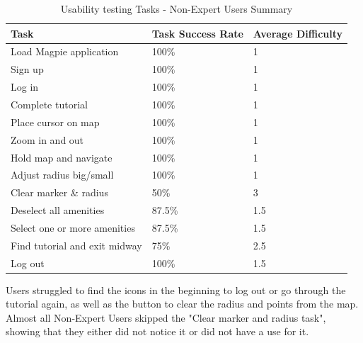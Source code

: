 \begin{table}[h!]
  \centering
  \caption{Usability testing Tasks - Non-Expert Users Summary}
  \begin{tabular}{|p{}|p{}|p{}|}
    \hline
    \textbf{Task}                 & \textbf{Task Success Rate} & \textbf{Average Difficulty} \\
    \hline
    Load Magpie application       & 100\%                      & 1                           \\
    \hline
    Sign up                       & 100\%                      & 1                           \\
    \hline
    Log in                        & 100\%                      & 1                           \\
    \hline
    Complete tutorial             & 100\%                      & 1                           \\
    \hline
    Place cursor on map           & 100\%                      & 1                           \\
    \hline
    Zoom in and out               & 100\%                      & 1                           \\
    \hline
    Hold map and navigate         & 100\%                      & 1                           \\
    \hline
    Adjust radius big/small       & 100\%                      & 1                           \\
    \hline
    Clear marker \& radius        & 50\%                       & 3                           \\
    \hline
    Deselect all amenities        & 87.5\%                     & 1.5                         \\
    \hline
    Select one or more amenities  & 87.5\%                     & 1.5                         \\
    \hline
    Find tutorial and exit midway & 75\%                       & 2.5                         \\
    \hline
    Log out                       & 100\%                      & 1.5                         \\
    \hline
  \end{tabular}
\end{table}

Users struggled to find the icons in the beginning to log out or go through the
tutorial again, as well as the button to clear the radius and points from the
map. Almost all Non-Expert Users skipped the "Clear marker and radius task",
showing that they either did not notice it or did not have a use for it.


